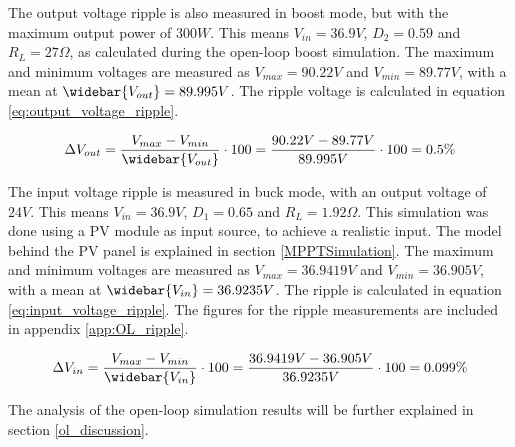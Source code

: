 The output voltage ripple is also measured in boost mode, but with the maximum output power of $300W$. This means $V_{in} = 36.9V$, $D_{2} = 0.59$ and $R_{L} = 27\Omega$, as calculated during the open-loop boost simulation. The maximum and minimum voltages are measured as $V_{max} = 90.22V$ and $V_{min} = 89.77V$, with a mean at $\widebar{V_{out}} = 89.995V$. The ripple voltage is calculated in equation \ref{eq:output_voltage_ripple}.

\begin{equation} \label{eq:output_voltage_ripple}
\Delta V_{out} = \frac{V_{max}-V_{min}}{\widebar{V_{out}}} \cdot 100 = \frac{90.22V-89.77V}{89.995V} \cdot 100 = 0.5\%
\end{equation}

The input voltage ripple is measured in buck mode, with an output voltage of $24V$. This means $V_{in} = 36.9V$, $D_{1} = 0.65$ and $R_{L} = 1.92\Omega$. This simulation was done using a PV module as input source, to achieve a realistic input. The model behind the PV panel is explained in section \ref{MPPTSimulation}. The maximum and minimum voltages are measured as $V_{max} = 36.9419V$ and $V_{min} = 36.905V$, with a mean at $\widebar{V_{in}} = 36.9235V$. The ripple is calculated in equation \ref{eq:input_voltage_ripple}. The figures for the ripple measurements are included in appendix \ref{app:OL_ripple}.

\begin{equation} \label{eq:input_voltage_ripple}
\Delta V_{in} = \frac{V_{max}-V_{min}}{\widebar{V_{in}}} \cdot 100 = \frac{36.9419V-36.905V}{36.9235V} \cdot 100 = 0.099\%
\end{equation}

The analysis of the open-loop simulation results will be further explained in section \ref{ol_discussion}.